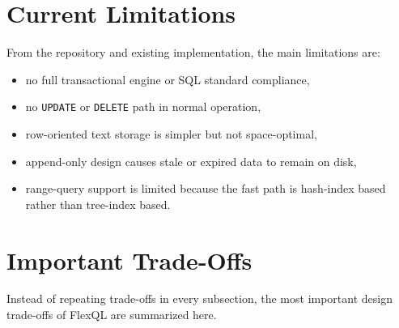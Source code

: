 \documentclass[12pt,a4paper]{article}
\begin{document}
\section{Current Limitations}

From the repository and existing implementation, the main limitations are:

\begin{itemize}[leftmargin=1.8em]
  \item no full transactional engine or SQL standard compliance,
  \item no \texttt{UPDATE} or \texttt{DELETE} path in normal operation,
  \item row-oriented text storage is simpler but not space-optimal,
  \item append-only design causes stale or expired data to remain on disk,
  \item range-query support is limited because the fast path is hash-index
        based rather than tree-index based.
\end{itemize}

\section{Important Trade-Offs}

Instead of repeating trade-offs in every subsection, the most important design
trade-offs of FlexQL are summarized here.
\end{document}
